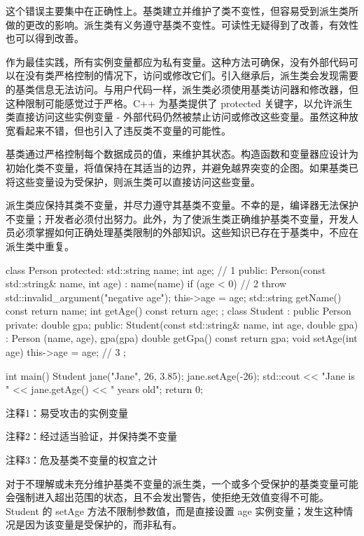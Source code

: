 这个错误主要集中在正确性上。基类建立并维护了类不变性，但容易受到派生类所做的更改的影响。派生类有义务遵守基类不变性。可读性无疑得到了改善，有效性也可以得到改善。

作为最佳实践，所有实例变量都应为私有变量。这种方法可确保，没有外部代码可以在没有类严格控制的情况下，访问或修改它们。引入继承后，派生类会发现需要的基类信息无法访问。与用户代码一样，派生类必须使用基类访问器和修改器，但这种限制可能感觉过于严格。C++ 为基类提供了 protected 关键字，以允许派生类直接访问这些实例变量 - 外部代码仍然被禁止访问或修改这些变量。虽然这种放宽看起来不错，但也引入了违反类不变量的可能性。


基类通过严格控制每个数据成员的值，来维护其状态。构造函数和变量器应设计为初始化类不变量，将值保持在其适当的边界，并避免越界突变的企图。如果基类已将这些变量设为受保护，则派生类可以直接访问这些变量。

派生类应保持其类不变量，并尽力遵守其基类不变量。不幸的是，编译器无法保护不变量；开发者必须付出努力。此外，为了使派生类正确维护基类不变量，开发人员必须掌握如何正确处理基类限制的外部知识。这些知识已存在于基类中，不应在派生类中重复。


\begin{cpp}
class Person {
protected:
  std::string name;
  int age; // 1
public:
  Person(const std::string& name, int age) : name(name) {
    if (age < 0) // 2
      throw std::invalid_argument("negative age");
    this->age = age;
  }
  std::string getName() const { return name; }
  int getAge() const { return age; }
};
class Student : public Person {
private:
  double gpa;
public:
  Student(const std::string& name, int age, double gpa) : Person
  (name, age), gpa(gpa) {}
  double getGpa() const { return gpa; }
  void setAge(int age) { this->age = age; } // 3
};

int main() {
  Student jane("Jane", 26, 3.85);
  jane.setAge(-26);
  std::cout << "Jane is " << jane.getAge() << " years old\n";
  return 0;
}
\end{cpp}

{\footnotesize
注释1：易受攻击的实例变量

注释2：经过适当验证，并保持类不变量

注释3：危及基类不变量的权宜之计
}


对于不理解或未充分维护基类不变量的派生类，一个或多个受保护的基类变量可能会强制进入超出范围的状态，且不会发出警告，使拒绝无效值变得不可能。Student 的 setAge 方法不限制参数值，而是直接设置 age 实例变量；发生这种情况是因为该变量是受保护的，而非私有。

